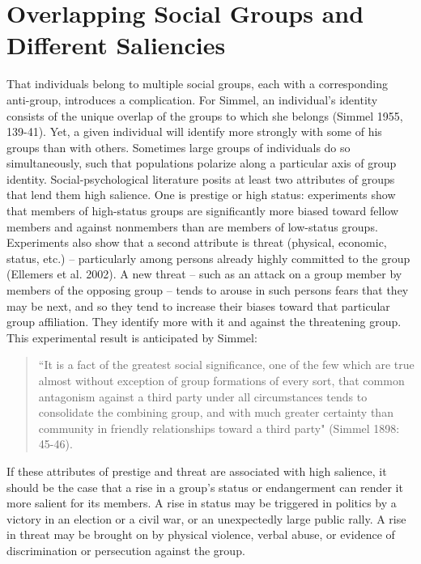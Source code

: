 \documentclass[12pt]{article}
\begin{document}
\section*{Overlapping Social Groups and Different Saliencies}
That individuals belong to multiple social groups, each with a corresponding anti-group, introduces a complication.  For Simmel, an individual's identity consists of the unique overlap of the groups to which she belongs (Simmel 1955, 139-41).  Yet, a given individual will identify more strongly with some of his groups than with others.  
Sometimes large groups of individuals do so simultaneously, such that populations polarize along a particular axis of group identity.   Social-psychological literature posits at least two attributes of groups that lend them high salience.  One is prestige or high status:  experiments show that members of high-status groups are significantly more biased toward fellow members and against nonmembers than are members of low-status groups.   Experiments also show that a second attribute is threat (physical, economic, status, etc.) – particularly among persons already highly committed to the group (Ellemers et al. 2002).  A new threat – such as an attack on a group member by members of the opposing group – tends to arouse in such persons fears that they may be next, and so they tend to increase their biases toward that particular group affiliation.  They identify more with it and against the threatening group.  This experimental result is anticipated by Simmel:

\begin{quotation}
	``It is a fact of the greatest social significance, one of the few which are true almost without exception of group formations of every sort, that common antagonism against a third party under all circumstances tends to consolidate the combining group, and with much greater certainty than community in friendly relationships toward a third party" (Simmel 1898: 45-46).
\end{quotation}


If these attributes of prestige and threat are associated with high salience, it should be the case that a rise in a group's status or endangerment can render it more salient for its members.  A rise in status may be triggered in politics by a victory in an election or a civil war, or an unexpectedly large public rally.  A rise in threat may be brought on by physical violence, verbal abuse, or evidence of discrimination or persecution against the group.
\end{document}
